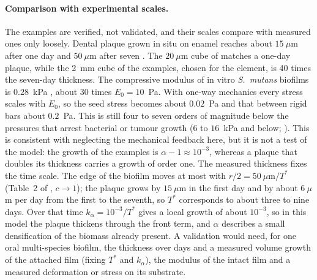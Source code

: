 \documentclass[11pt,a4paper]{article}
\begin{document}
\paragraph{Comparison with experimental scales.} The examples are verified, not validated, and their scales compare with measured ones only loosely. Dental plaque grown in situ on enamel reaches about $15~\mu$m after one day and $50~\mu$m after seven \citep{AlAhmad2007PlaqueFISH}. The $20~\mu$m cube of \citet{Klempt2024DiffusionDrivenGrowth} matches a one-day plaque, while the 2~mm cube of the examples, chosen for the element, is 40 times the seven-day thickness. The compressive modulus of in vitro \emph{S.~mutans} biofilms is $0.28$~kPa \citep{Rmaile2013MicrobialTribology}, about 30 times $E_0=10$~Pa. With one-way mechanics every stress scales with $E_0$, so the seed stress becomes about $0.02$~Pa and that between rigid bars about $0.2$~Pa. This is still four to seven orders of magnitude below the pressures that arrest bacterial or tumour growth ($6$ to $16$~kPa and below; \citealp{Chu2018SelfInducedStress,Helmlinger1997SolidStress}). This is consistent with neglecting the mechanical feedback here, but it is not a test of the model: the growth of the examples is $\alpha-1\approx10^{-3}$, whereas a plaque that doubles its thickness carries a growth of order one. The measured thickness fixes the time scale. The edge of the biofilm moves at most with $r/2=50~\mu$m$/T^*$ (Table~2 of \citealp{Klempt2024DiffusionDrivenGrowth}, $c\to1$); the plaque grows by $15~\mu$m in the first day and by about $6~\mu$m per day from the first to the seventh, so $T^*$ corresponds to about three to nine days. Over that time $k_\alpha=10^{-3}/T^*$ gives a local growth of about $10^{-3}$, so in this model the plaque thickens through the front term, and $\alpha$ describes a small densification of the biomass already present. A validation would need, for one oral multi-species biofilm, the thickness over days and a measured volume growth of the attached film (fixing $T^*$ and $k_\alpha$), the modulus of the intact film and a measured deformation or stress on its substrate.
\end{document}
